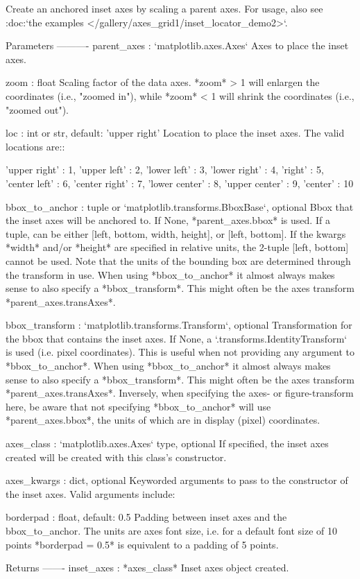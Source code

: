 \begin{DoxyVerb}Create an anchored inset axes by scaling a parent axes. For usage, also see
:doc:`the examples </gallery/axes_grid1/inset_locator_demo2>`.

Parameters
----------
parent_axes : `matplotlib.axes.Axes`
    Axes to place the inset axes.

zoom : float
    Scaling factor of the data axes. *zoom* > 1 will enlargen the
    coordinates (i.e., "zoomed in"), while *zoom* < 1 will shrink the
    coordinates (i.e., "zoomed out").

loc : int or str, default: 'upper right'
    Location to place the inset axes. The valid locations are::

        'upper right'  : 1,
        'upper left'   : 2,
        'lower left'   : 3,
        'lower right'  : 4,
        'right'        : 5,
        'center left'  : 6,
        'center right' : 7,
        'lower center' : 8,
        'upper center' : 9,
        'center'       : 10

bbox_to_anchor : tuple or `matplotlib.transforms.BboxBase`, optional
    Bbox that the inset axes will be anchored to. If None,
    *parent_axes.bbox* is used. If a tuple, can be either
    [left, bottom, width, height], or [left, bottom].
    If the kwargs *width* and/or *height* are specified in relative units,
    the 2-tuple [left, bottom] cannot be used. Note that
    the units of the bounding box are determined through the transform
    in use. When using *bbox_to_anchor* it almost always makes sense to
    also specify a *bbox_transform*. This might often be the axes transform
    *parent_axes.transAxes*.

bbox_transform : `matplotlib.transforms.Transform`, optional
    Transformation for the bbox that contains the inset axes.
    If None, a `.transforms.IdentityTransform` is used (i.e. pixel
    coordinates). This is useful when not providing any argument to
    *bbox_to_anchor*. When using *bbox_to_anchor* it almost always makes
    sense to also specify a *bbox_transform*. This might often be the
    axes transform *parent_axes.transAxes*. Inversely, when specifying
    the axes- or figure-transform here, be aware that not specifying
    *bbox_to_anchor* will use *parent_axes.bbox*, the units of which are
    in display (pixel) coordinates.

axes_class : `matplotlib.axes.Axes` type, optional
    If specified, the inset axes created will be created with this class's
    constructor.

axes_kwargs : dict, optional
    Keyworded arguments to pass to the constructor of the inset axes.
    Valid arguments include:


borderpad : float, default: 0.5
    Padding between inset axes and the bbox_to_anchor.
    The units are axes font size, i.e. for a default font size of 10 points
    *borderpad = 0.5* is equivalent to a padding of 5 points.

Returns
-------
inset_axes : *axes_class*
    Inset axes object created.
\end{DoxyVerb}
 